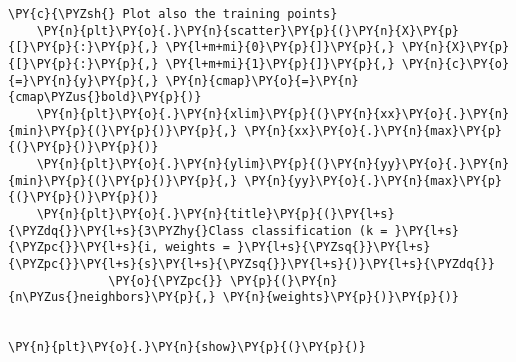 \begin{notebookcell}[]
\begin{addmargin}[\cellleftmargin]{0em}
{\begin{Verbatim}[commandchars=\\\{\}]
    \PY{c}{\PYZsh{} Plot also the training points}
    \PY{n}{plt}\PY{o}{.}\PY{n}{scatter}\PY{p}{(}\PY{n}{X}\PY{p}{[}\PY{p}{:}\PY{p}{,} \PY{l+m+mi}{0}\PY{p}{]}\PY{p}{,} \PY{n}{X}\PY{p}{[}\PY{p}{:}\PY{p}{,} \PY{l+m+mi}{1}\PY{p}{]}\PY{p}{,} \PY{n}{c}\PY{o}{=}\PY{n}{y}\PY{p}{,} \PY{n}{cmap}\PY{o}{=}\PY{n}{cmap\PYZus{}bold}\PY{p}{)}
    \PY{n}{plt}\PY{o}{.}\PY{n}{xlim}\PY{p}{(}\PY{n}{xx}\PY{o}{.}\PY{n}{min}\PY{p}{(}\PY{p}{)}\PY{p}{,} \PY{n}{xx}\PY{o}{.}\PY{n}{max}\PY{p}{(}\PY{p}{)}\PY{p}{)}
    \PY{n}{plt}\PY{o}{.}\PY{n}{ylim}\PY{p}{(}\PY{n}{yy}\PY{o}{.}\PY{n}{min}\PY{p}{(}\PY{p}{)}\PY{p}{,} \PY{n}{yy}\PY{o}{.}\PY{n}{max}\PY{p}{(}\PY{p}{)}\PY{p}{)}
    \PY{n}{plt}\PY{o}{.}\PY{n}{title}\PY{p}{(}\PY{l+s}{\PYZdq{}}\PY{l+s}{3\PYZhy{}Class classification (k = }\PY{l+s}{\PYZpc{}}\PY{l+s}{i, weights = }\PY{l+s}{\PYZsq{}}\PY{l+s}{\PYZpc{}}\PY{l+s}{s}\PY{l+s}{\PYZsq{}}\PY{l+s}{)}\PY{l+s}{\PYZdq{}}
              \PY{o}{\PYZpc{}} \PY{p}{(}\PY{n}{n\PYZus{}neighbors}\PY{p}{,} \PY{n}{weights}\PY{p}{)}\PY{p}{)}


\PY{n}{plt}\PY{o}{.}\PY{n}{show}\PY{p}{(}\PY{p}{)}
\end{Verbatim}
%
\par%
\vspace{-1\smallerfontscale}}%
\end{addmargin}
\end{notebookcell}

